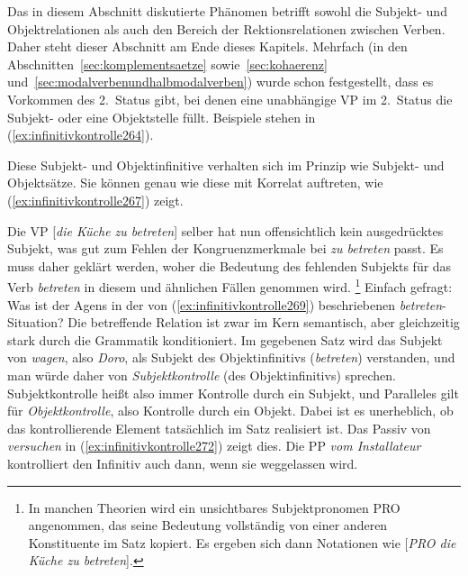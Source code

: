 
Das in diesem Abschnitt diskutierte Phänomen betrifft sowohl die Subjekt- und Objektrelationen als auch den Bereich der Rektionsrelationen zwischen Verben.
Daher steht dieser Abschnitt am Ende dieses Kapitels.
Mehrfach (\zB in den Abschnitten~\ref{sec:komplementsaetze} sowie~\ref{sec:kohaerenz} und~\ref{sec:modalverbenundhalbmodalverben}) wurde schon festgestellt, dass es Vorkommen des 2.~Status gibt, bei denen eine unabhängige VP im 2.~Status \zB die Subjekt- oder eine Objektstelle füllt.
Beispiele stehen in (\ref{ex:infinitivkontrolle264}).


\begin{exe}
  \ex\label{ex:infinitivkontrolle264}
  \begin{xlist}
  \end{xlist}
\end{exe}


Diese Subjekt- und Objektinfinitive verhalten sich im Prinzip wie Subjekt- und Objektsätze.
Sie können genau wie diese mit Korrelat auftreten, wie (\ref{ex:infinitivkontrolle267}) zeigt.

\begin{exe}
  \ex\label{ex:infinitivkontrolle267}
  \begin{xlist}
  \end{xlist}
\end{exe}

Die VP [\textit{die Küche zu betreten}] selber hat nun offensichtlich kein ausgedrücktes Subjekt, was gut zum Fehlen der Kongruenzmerkmale bei \textit{zu betreten} passt.
Es muss daher geklärt werden, woher die Bedeutung des fehlenden Subjekts für das Verb \textit{betreten} in diesem und ähnlichen Fällen genommen wird.%
\footnote{In manchen Theorien wird ein unsichtbares Subjektpronomen PRO angenommen, das seine Bedeutung vollständig von einer anderen Konstituente im Satz kopiert.
Es ergeben sich dann Notationen wie [\textit{PRO die Küche zu betreten}].}
Einfach gefragt:
Was ist der Agens in der von (\ref{ex:infinitivkontrolle269}) beschriebenen \textit{betreten}-Situation?
Die betreffende Relation ist zwar im Kern semantisch, aber gleichzeitig stark durch die Grammatik konditioniert.
Im gegebenen Satz wird das Subjekt von \textit{wagen}, also \textit{Doro}, als Subjekt des Objektinfinitivs (\textit{betreten}) verstanden, und man würde daher von \textit{Subjektkontrolle} (des Objektinfinitivs) sprechen.
Subjektkontrolle heißt also immer Kontrolle durch ein Subjekt, und Paralleles gilt für \textit{Objektkontrolle}, also Kontrolle durch ein Objekt.
Dabei ist es unerheblich, ob das kontrollierende Element tatsächlich im Satz realisiert ist.
Das Passiv von \textit{versuchen} in (\ref{ex:infinitivkontrolle272}) zeigt dies.
Die PP \textit{vom Installateur} kontrolliert den Infinitiv auch dann, wenn sie weggelassen wird.


